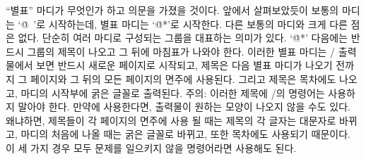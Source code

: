 ``별표'' 마디가 무엇인가 하고 의문을 가졌을 것이다. 앞에서 살펴보았듯이 보통의 마디는
`\.{@\ }'로 시작하는데, 별표 마디는 `\.{@*}'로 시작한다. 다른 보통의 마디와 크게 다른 점은
없다. 단순히 여러 마디로 구성되는 그룹을 대표하는 의미가 있다. `\.{@*}' 다음에는 반드시
그룹의 제목이 나오고 그 뒤에 마침표가 나와야 한다. 이러한 별표 마디는 \TEX/ 출력물에서 보면
반드시 새로운 페이지로 시작되고, 제목은 다음 별표 마디가 나오기 전까지 그 페이지와 그 뒤의
모든 페이지의 면주에 사용된다. 그리고 제목은 목차에도 나오고, 마디의 시작부에 굵은 글꼴로
출력된다.
주의: 이러한 제목에 \TEX/의 명령어는 사용하지 말아야 한다. 만약에 사용한다면, 출력물이 
원하는 모양이 나오지 않을 수도 있다. 왜냐하면, 제목들이 각 페이지의 면주에 사용 될 때는
제목의 각 글자는 대문자로 바뀌고, 마디의 처음에 나올 때는 굵은 글꼴로 바뀌고, 또한 목차에도
사용되기 때문이다. 이 세 가지 경우 모두 문제를 일으키지 않을 명령어라면 사용해도 된다.

